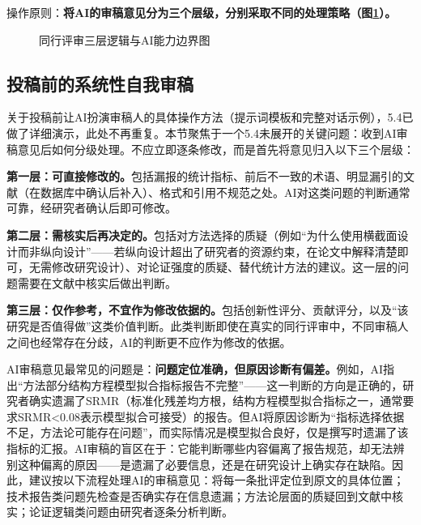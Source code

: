 操作原则：\textbf{将AI的审稿意见分为三个层级，分别采取不同的处理策略（图\ref{fig:ch5_08}）。}

\begin{figure}[H]
\centering
{}
\caption{同行评审三层逻辑与AI能力边界图}
\label{fig:ch5_08}
\end{figure}
\par

\subsection{投稿前的系统性自我审稿}

关于投稿前让AI扮演审稿人的具体操作方法（提示词模板和完整对话示例），5.4已做了详细演示，此处不再重复。本节聚焦于一个5.4未展开的关键问题：收到AI审稿意见后如何分级处理。不应立即逐条修改，而是首先将意见归入以下三个层级：

\textbf{第一层：可直接修改的。}包括漏报的统计指标、前后不一致的术语、明显漏引的文献（在数据库中确认后补入）、格式和引用不规范之处。AI对这类问题的判断通常可靠，经研究者确认后即可修改。

\textbf{第二层：需核实后再决定的。}包括对方法选择的质疑（例如``为什么使用横截面设计而非纵向设计''——若纵向设计超出了研究者的资源约束，在论文中解释清楚即可，无需修改研究设计）、对论证强度的质疑、替代统计方法的建议。这一层的问题需要在文献中核实后做出判断。

\textbf{第三层：仅作参考，不宜作为修改依据的。}包括创新性评分、贡献评分，以及``该研究是否值得做''这类价值判断。此类判断即使在真实的同行评审中，不同审稿人之间也经常存在分歧，AI的判断更不应作为修改的依据。

\begin{critiquebox}
AI审稿意见最常见的问题是：\textbf{问题定位准确，但原因诊断有偏差。}例如，AI指出``方法部分结构方程模型拟合指标报告不完整''——这一判断的方向是正确的，研究者确实遗漏了SRMR（标准化残差均方根，结构方程模型拟合指标之一，通常要求SRMR<0.08表示模型拟合可接受）的报告。但AI将原因诊断为``指标选择依据不足，方法论可能存在问题''，而实际情况是模型拟合良好，仅是撰写时遗漏了该指标的汇报。AI审稿的盲区在于：它能判断哪些内容偏离了报告规范，却无法辨别这种偏离的原因——是遗漏了必要信息，还是在研究设计上确实存在缺陷。因此，建议按以下流程处理AI的审稿意见：将每一条批评定位到原文的具体位置；技术报告类问题先检查是否确实存在信息遗漏；方法论层面的质疑回到文献中核实；论证逻辑类问题由研究者逐条分析判断。
\end{critiquebox}


